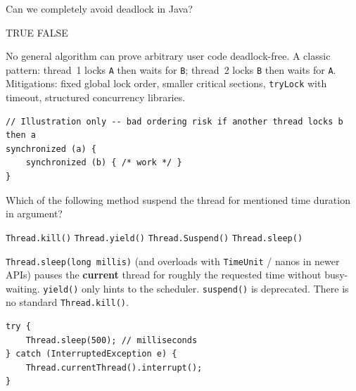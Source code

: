 \question[4]
Can we completely avoid deadlock in Java?
\begin{choices}
  \choice TRUE
  \CorrectChoice FALSE
\end{choices}
\begin{solution}
  No general algorithm can prove arbitrary user code deadlock-free. A classic pattern: thread~1 locks \texttt{A} then waits for \texttt{B}; thread~2 locks \texttt{B} then waits for \texttt{A}. Mitigations: fixed global lock order, smaller critical sections, \texttt{tryLock} with timeout, structured concurrency libraries.

\begin{lstlisting}[style=javaexam]
// Illustration only -- bad ordering risk if another thread locks b then a
synchronized (a) {
    synchronized (b) { /* work */ }
}
\end{lstlisting}
\end{solution}

\question[4]
Which of the following method suspend the thread for mentioned time duration in argument?
\begin{choices}
  \choice \texttt{Thread.kill()}
  \choice \texttt{Thread.yield()}
  \choice \texttt{Thread.Suspend()}
  \CorrectChoice \texttt{Thread.sleep()}
\end{choices}
\begin{solution}
  \texttt{Thread.sleep(long millis)} (and overloads with \texttt{TimeUnit} / nanos in newer APIs) pauses the \textbf{current} thread for roughly the requested time without busy-waiting. \texttt{yield()} only hints to the scheduler. \texttt{suspend()} is deprecated. There is no standard \texttt{Thread.kill()}.

\begin{lstlisting}[style=javaexam]
try {
    Thread.sleep(500); // milliseconds
} catch (InterruptedException e) {
    Thread.currentThread().interrupt();
}
\end{lstlisting}
\end{solution}

